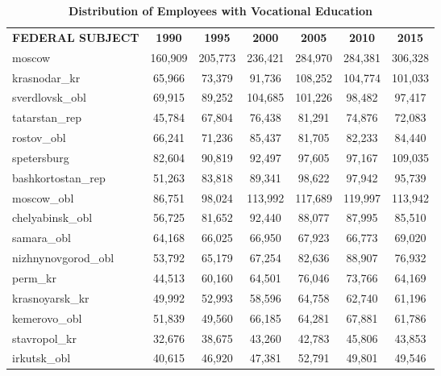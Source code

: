 \documentclass[alpha-refs,fleqn]{wiley-article_p2}
\begin{document}
\setcounter{table}{1} 
\renewcommand{\thetable}{A\arabic{table}}
\smaller
\begin{table}[h]
\caption{\textbf{Distribution of Employees with Vocational Education}}\label{table:a1}
\begin{threeparttable}
\setlength{\tabcolsep}{5pt}
\renewcommand{\arraystretch}{1.25}
\begin{tabular}{p{5.5cm}cccccc}
\rowcolor{grey!30} 
\textbf{FEDERAL SUBJECT}	&	\textbf{1990}	&	\textbf{1995}	&	\textbf{2000}	&	\textbf{2005}	&	\textbf{2010}	&	\textbf{2015} 	\\
\rowcolor{blue!20}
moscow	&	160,909	&	205,773	&	236,421	&	284,970	&	284,381	&	306,328	\\
\rowcolor{blue!20}
krasnodar\_kr	&	65,966	&	73,379	&	91,736	&	108,252	&	104,774	&	101,033	\\
\rowcolor{blue!20}
sverdlovsk\_obl	&	69,915	&	89,252	&	104,685	&	101,226	&	98,482	&	97,417	\\
\rowcolor{blue!20}
tatarstan\_rep	&	45,784	&	67,804	&	76,438	&	81,291	&	74,876	&	72,083	\\
rostov\_obl	&	66,241	&	71,236	&	85,437	&	81,705	&	82,233	&	84,440	\\
\rowcolor{blue!20}
spetersburg	&	82,604	&	90,819	&	92,497	&	97,605	&	97,167	&	109,035	\\
\rowcolor{blue!20}
bashkortostan\_rep	&	51,263	&	83,818	&	89,341	&	98,622	&	97,942	&	95,739	\\
\rowcolor{blue!20}
moscow\_obl	&	86,751	&	98,024	&	113,992	&	117,689	&	119,997	&	113,942	\\
\rowcolor{blue!20}
chelyabinsk\_obl	&	56,725	&	81,652	&	92,440	&	88,077	&	87,995	&	85,510	\\
samara\_obl	&	64,168	&	66,025	&	66,950	&	67,923	&	66,773	&	69,020	\\
\rowcolor{blue!20}
nizhnynovgorod\_obl	&	53,792	&	65,179	&	67,254	&	82,636	&	88,907	&	76,932	\\
\rowcolor{blue!20}
perm\_kr	&	44,513	&	60,160	&	64,501	&	76,046	&	73,766	&	64,169	\\
krasnoyarsk\_kr	&	49,992	&	52,993	&	58,596	&	64,758	&	62,740	&	61,196	\\
kemerovo\_obl	&	51,839	&	49,560	&	66,185	&	64,281	&	67,881	&	61,786	\\
stavropol\_kr	&	32,676	&	38,675	&	43,260	&	42,783	&	45,806	&	43,853	\\
irkutsk\_obl	&	40,615	&	46,920	&	47,381	&	52,791	&	49,801	&	49,546	\\

\end{tabular}
\end{threeparttable}
\end{table}
\end{document}
